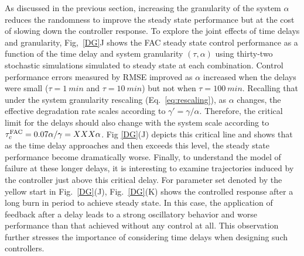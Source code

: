 \documentclass[12pt]{iopart}
\begin{document}
As discussed in the previous section, increasing the granularity of the system $\alpha$ reduces the randomness to improve the steady state performance but at the cost of slowing down the controller response.  To explore the joint effects of time delays and granularity, Fig,\ \ref{DG}J shows the FAC steady state control performance as a function of the time delay and system granularity $(\tau,\alpha)$ using thirty-two stochastic simulations simulated to steady state at each combination. Control performance errors measured by RMSE improved as $\alpha$ increased when the delays were small ($\tau=1 \ min$ and $\tau=10 \ min$) but not when $\tau=100 \ min$. 
\brian[What are the units of tau in fig 5?  This section is confusing in that it is not clear to me how tau and gamma are changing relative to one another when alpha is changed. From Eq 21 it seems that gamma changes with 1/alpha.  If this is correct, does that mean that the critical time changes with $\tau_c = 1/gamma = alpha/gamma ~= 5*alpha$?  If you plot that as a thick dashed dark line in Fig 5J,  would it match to the contours? ] \michael[$tc=1/(0.7*alpha)$ matches the counters well]
Recalling that under the system granularity rescaling (Eq.\ \ref{eq:rescaling}), as $\alpha$ changes, the effective degradation rate scales according to $\gamma' = \gamma/\alpha$.  Therefore, the critical limit for the delays should also change with the system scale according to $\tau_c^{\rm FAC} = 0.07\alpha/\gamma = XXX\alpha$. Fig \ref{DG}(J) depicts this critical line and shows that as the time delay approaches and then exceeds this level, the steady state performance become dramatically worse. 
Finally, to understand the model of failure at these longer delays, it is interesting to examine trajectories induced by the controller just above this critical delay. For parameter set denoted by the yellow start in Fig.\ \ref {DG}(J), Fig.\ \ref {DG}(K) shows the controlled response after a long burn in period to achieve steady state. In this case, the application of feedback after a delay leads to a strong oscillatory behavior and worse performance than that achieved without any control at all. This observation further stresses the importance of considering time delays when designing such controllers.
\end{document}

